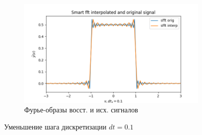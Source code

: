 \documentclass[a4paper, 12pt]{article}
\begin{document}
\begin{figure}[H]
\begin{subfigure}{0.45\textwidth}
            \centering
            \includegraphics[width=\linewidth]{2_fsinc.png}
            \caption{Фурье-образы восст. и исх. сигналов}
            \label{fig:fisinc2}
        \end{subfigure}
        \caption{Уменьшение шага дискретизации $dt=0.1$}
        \label{fig:sincs2}
    \end{figure}
\end{document}
